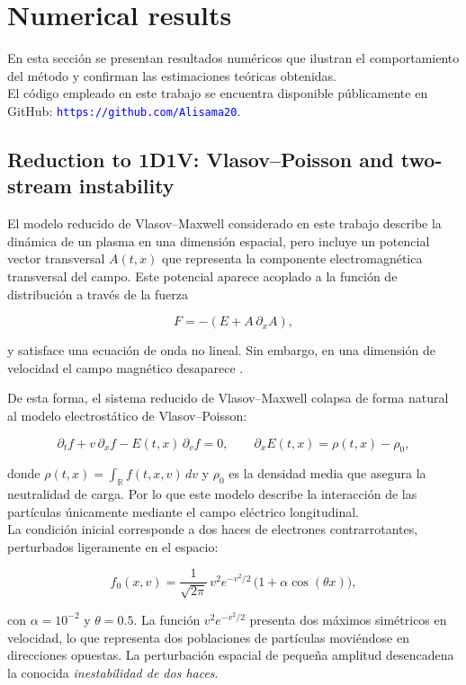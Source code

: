 \documentclass[11pt,a4paper,twoside,pdf]{article}
\numberwithin{equation}{section}
\begin{document}
\section{Numerical results}

En esta sección se presentan resultados numéricos que ilustran el
comportamiento del método y confirman las estimaciones teóricas obtenidas.\\

El código empleado en este trabajo se encuentra disponible públicamente en GitHub: \textcolor{blue}{\texttt{https://github.com/Alisama20}}.



\subsection{Reduction to 1D1V: Vlasov--Poisson and two-stream instability}



El modelo reducido de Vlasov--Maxwell considerado en este trabajo describe la
dinámica de un plasma en una dimensión espacial, pero incluye un potencial vector
transversal $A(t,x)$ que representa la componente electromagnética transversal del
campo. Este potencial aparece acoplado a la función de distribución a través de la
fuerza


\[
F = -\left(E + A\,\partial_x A\right),
\]


y satisface una ecuación de onda no lineal. Sin embargo, en una dimensión de velocidad el campo magnético desaparece \cite{martin2021campo}.

De esta forma, el sistema reducido de Vlasov--Maxwell colapsa de forma
natural al modelo electrostático de Vlasov--Poisson:


\[
\partial_t f + v\,\partial_x f - E(t,x)\,\partial_v f = 0,
\qquad
\partial_x E(t,x) = \rho(t,x) - \rho_0,
\]


donde $\rho(t,x)=\int_{\mathbb{R}} f(t,x,v)\,dv$ y $\rho_0$ es la densidad media que asegura la neutralidad de carga.
Por lo que este modelo describe la interacción de las partículas únicamente mediante el campo
eléctrico longitudinal.\\


La condición inicial corresponde a dos haces de electrones contrarrotantes, perturbados ligeramente en el espacio:


\[
f_0(x,v) = \frac{1}{\sqrt{2\pi}}\,v^2 e^{-v^2/2}\,\big(1+\alpha\cos(\theta x)\big),
\]


con $\alpha=10^{-2}$ y $\theta=0.5$. La función $v^2 e^{-v^2/2}$ presenta dos máximos
simétricos en velocidad, lo que representa dos poblaciones de partículas moviéndose
en direcciones opuestas. La perturbación espacial de pequeña amplitud desencadena la conocida \textit{inestabilidad de dos haces}.
\end{document}
